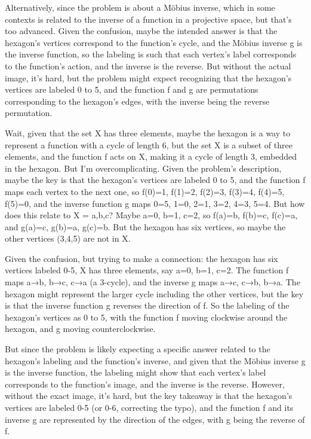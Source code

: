 Alternatively, since the problem is about a Möbius inverse, which in some contexts is related to the inverse of a function in a projective space, but that's too advanced. Given the confusion, maybe the intended answer is that the hexagon's vertices correspond to the function's cycle, and the Möbius inverse g is the inverse function, so the labeling is such that each vertex's label corresponds to the function's action, and the inverse is the reverse. But without the actual image, it's hard, but the problem might expect recognizing that the hexagon's vertices are labeled 0 to 5, and the function f and g are permutations corresponding to the hexagon's edges, with the inverse being the reverse permutation. 

Wait, given that the set X has three elements, maybe the hexagon is a way to represent a function with a cycle of length 6, but the set X is a subset of three elements, and the function f acts on X, making it a cycle of length 3, embedded in the hexagon. But I'm overcomplicating. Given the problem's description, maybe the key is that the hexagon's vertices are labeled 0 to 5, and the function f maps each vertex to the next one, so f(0)=1, f(1)=2, f(2)=3, f(3)=4, f(4)=5, f(5)=0, and the inverse function g maps 0=5, 1=0, 2=1, 3=2, 4=3, 5=4. But how does this relate to X = {a,b,c}? Maybe a=0, b=1, c=2, so f(a)=b, f(b)=c, f(c)=a, and g(a)=c, g(b)=a, g(c)=b. But the hexagon has six vertices, so maybe the other vertices (3,4,5) are not in X. 

Given the confusion, but trying to make a connection: the hexagon has six vertices labeled 0-5, X has three elements, say a=0, b=1, c=2. The function f maps a→b, b→c, c→a (a 3-cycle), and the inverse g maps a→c, c→b, b→a. The hexagon might represent the larger cycle including the other vertices, but the key is that the inverse function g reverses the direction of f. So the labeling of the hexagon's vertices as 0 to 5, with the function f moving clockwise around the hexagon, and g moving counterclockwise. 

But since the problem is likely expecting a specific answer related to the hexagon's labeling and the function's inverse, and given that the Möbius inverse g is the inverse function, the labeling might show that each vertex's label corresponds to the function's image, and the inverse is the reverse. However, without the exact image, it's hard, but the key takeaway is that the hexagon's vertices are labeled 0-5 (or 0-6, correcting the typo), and the function f and its inverse g are represented by the direction of the edges, with g being the reverse of f. 

